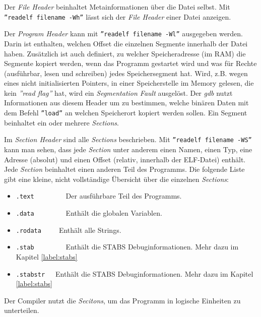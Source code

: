 


Der \textit{File Header} beinhaltet Metainformationen über die Datei selbst.
Mit \texttt{''readelf filename -Wh''} lässt sich der \textit{File Header} einer Datei anzeigen.

Der \textit{Program Header} kann mit \texttt{''readelf filename -Wl''} ausgegeben werden.
Darin ist enthalten, welchen Offset die einzelnen Segmente innerhalb der Datei haben.
Zusätzlich ist auch definiert, zu welcher Speicheradresse (im RAM) die Segmente kopiert werden, wenn das Programm gestartet wird und was für Rechte (ausführbar, lesen und schreiben) jedes Speichersegment hat.
Wird, z.B. wegen eines nicht initialisierten Pointers, in einer Speicherstelle im Memory gelesen, die kein \textit{''read flag''} hat, wird ein \textit{Segmentation Fault} ausgelöst.
Der \textit{gdb} nutzt Informationen aus diesem Header um zu bestimmen, welche binären Daten mit dem Befehl \texttt{''load''} an welchen Speicherort kopiert werden sollen.
Ein Segment beinhaltet ein oder mehrere \textit{Sections}.

Im \textit{Section Header} sind alle \textit{Sections} beschrieben.
Mit \texttt{''readelf filename -WS''} kann man sehen, dass jede \textit{Section} unter anderem einen Namen, einen Typ, eine Adresse (absolut) und einen Offset (relativ, innerhalb der ELF-Datei) enthält.
Jede \textit{Section} beinhaltet einen anderen Teil des Programms.
Die folgende Liste gibt eine kleine, nicht vollständige Übersicht über die einzelnen \textit{Sections}:
\begin{itemize}
	\item \texttt{.text}\ \ \ \ \ \ \ \ \ Der ausführbare Teil des Programms.
	\item \texttt{.data}\ \ \ \ \ \ \ \ \ Enthält die globalen Variablen.
	\item \texttt{.rodata}\ \ \ \ \ Enthält alle Strings.
	\item \texttt{.stab}\ \ \ \ \ \ \ \ \ Enthält die STABS Debuginformationen. Mehr dazu im Kapitel \ref{label:stabs} 
	\item \texttt{.stabstr}\ \ \ Enthält die STABS Debuginformationen. Mehr dazu im Kapitel \ref{label:stabs} 
\end{itemize}
Der Compiler nutzt die \textit{Secitons}, um das Programm in logische Einheiten zu unterteilen.


